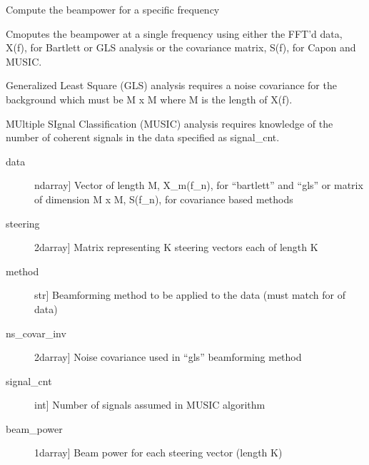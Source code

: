 \documentclass[letterpaper,10pt,english]{sphinxmanual}
\begin{document}
\begin{fulllineitems}
\label{\detokenize{infrapy.detection:infrapy.detection.beamforming_new.compute_beam_power}}
Compute the beampower for a specific frequency

Cmoputes the beampower at a single frequency using either the FFT’d data, X(f),
for Bartlett or GLS analysis or the covariance matrix, S(f), for Capon and MUSIC.

Generalized Least Square (GLS) analysis requires a noise covariance for the
background which must be M x M where M is the length of X(f).

MUltiple SIgnal Classification (MUSIC) analysis requires knowledge of the number
of coherent signals in the data specified as signal\_cnt.
\begin{description}
\item[{data}] \leavevmode{[}ndarray{]}
Vector of length M, X\_m(f\_n), for “bartlett” and “gls” or matrix of
dimension M x M, S(f\_n), for covariance based methods

\item[{steering}] \leavevmode{[}2darray{]}
Matrix representing K steering vectors each of length K

\item[{method}] \leavevmode{[}str{]}
Beamforming method to be applied to the data (must match
for of data)

\item[{ns\_covar\_inv}] \leavevmode{[}2darray{]}
Noise covariance used in “gls” beamforming method

\item[{signal\_cnt}] \leavevmode{[}int{]}
Number of signals assumed in MUSIC algorithm

\end{description}
\begin{description}
\item[{beam\_power}] \leavevmode{[}1darray{]}
Beam power for each steering vector (length K)

\end{description}

\end{fulllineitems}

\end{document}
